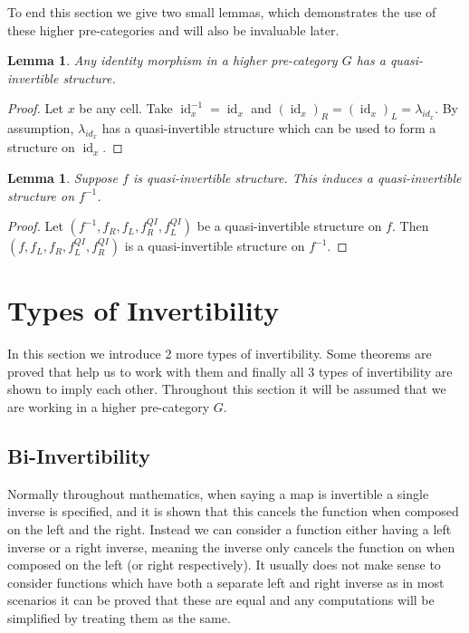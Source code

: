 \documentclass[draft]{article}
\newtheorem{lemma}[theorem]{Lemma} \theoremstyle{definition}
\DeclareMathOperator{\id}{id}
\newcommand{\inv}[1]{#1^{-1}} \newcommand{\comp}{\star}
\begin{document}
To end this section we give two small lemmas, which demonstrates the
use of these higher pre-categories and will also be invaluable later.

\begin{lemma}\label{identity}
  Any identity morphism in a higher pre-category \(G\) has a
  quasi-invertible structure.
\end{lemma}

\begin{proof}
  Let \(x\) be any cell. Take \(\inv {\id_x} = \id_x\) and
  \({(\id_x)}_R = {(\id_x)}_L = \lambda_{id_x}\). By assumption,
  \(\lambda_{id_x}\) has a quasi-invertible structure which can be
  used to form a structure on \(\id_x\).
\end{proof}

\begin{lemma}\label{inverse-invert}
  Suppose \(f\) is quasi-invertible structure. This induces a
  quasi-invertible structure on \(\inv f\).
\end{lemma}

\begin{proof}
  Let \((\inv f, f_R, f_L, f_R^{QI}, f_L^{QI})\) be a quasi-invertible
  structure on \(f\). Then \((f , f_L, f_R, f_L^{QI}, f_R^{QI})\) is a
  quasi-invertible structure on \(\inv f\).
\end{proof}

\section{Types of Invertibility}\label{sec:invertibility}

In this section we introduce 2 more types of invertibility. Some
theorems are proved that help us to work with them and finally all 3
types of invertibility are shown to imply each other. Throughout this
section it will be assumed that we are working in a higher
pre-category \(G\).

\subsection{Bi-Invertibility}\label{sec:bi-invertibility}

Normally throughout mathematics, when saying a map is invertible a
single inverse is specified, and it is shown that this cancels the
function when composed on the left and the right. Instead we can
consider a function either having a left inverse or a right inverse,
meaning the inverse only cancels the function on when composed on the
left (or right respectively). It usually does not make sense to
consider functions which have both a separate left and right inverse
as in most scenarios it can be proved that these are equal and any
computations will be simplified by treating them as the same.
\end{document}
